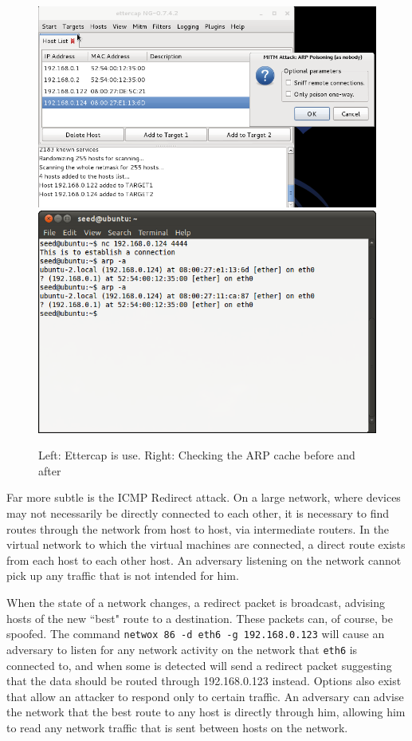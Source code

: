\begin{figure}[h]
    \centering
    \includegraphics[width=.5\linewidth]{images/ettercap.png}
    \includegraphics[width=.45\linewidth]{images/arp.png}
    \caption{Left: Ettercap is use. Right: Checking the ARP cache before and after}
    \label{fig:etterarp}
\end{figure}

Far more subtle is the ICMP Redirect attack. On a large network, where devices may not necessarily be directly connected
to each other, it is necessary to find routes through the network from host to host, via intermediate routers. In the
virtual network to which the virtual machines are connected, a direct route exists from each host to each other host. An
adversary listening on the network cannot pick up any traffic that is not intended for him.


When the state of a network changes, a redirect packet is broadcast, advising hosts of the new ``best" route to a
destination. These packets can, of course, be spoofed. The command {\tt netwox 86 -d eth6 -g 192.168.0.123} will cause
an adversary to listen for any network activity on the network that {\tt eth6} is connected to, and when some is
detected will send a redirect packet suggesting that the data should be routed through 192.168.0.123 instead. Options
also exist that allow an attacker to respond only to certain traffic. An adversary can advise the network that the best
route to any host is directly through him, allowing him to read any network traffic that is sent between hosts on the
network.


